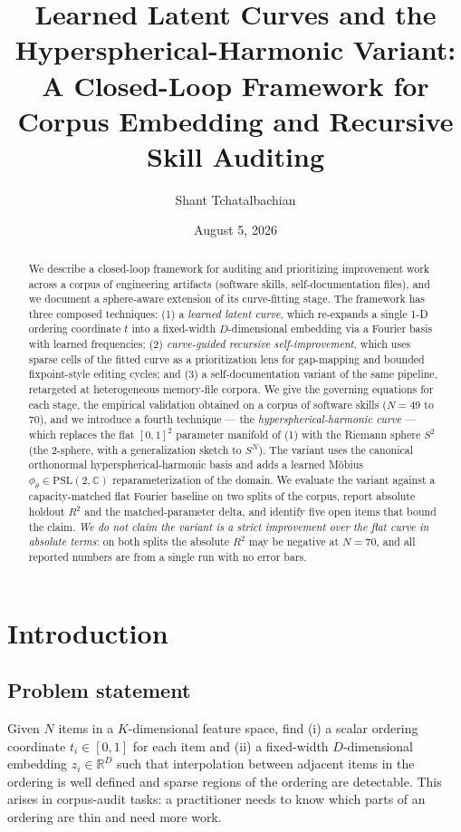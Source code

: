 \documentclass[11pt,a4paper]{article}
\title{Learned Latent Curves and the Hyperspherical-Harmonic Variant:\\
  {\large A Closed-Loop Framework for Corpus Embedding and Recursive Skill Auditing}}
\author{Shant Tchatalbachian}
\date{August 5, 2026}
\begin{document}
\maketitle

\begin{abstract}
We describe a closed-loop framework for auditing and prioritizing improvement work across a corpus of engineering artifacts (software skills, self-documentation files), and we document a sphere-aware extension of its curve-fitting stage. The framework has three composed techniques: (1) a \emph{learned latent curve}, which re-expands a single 1-D ordering coordinate $t$ into a fixed-width $D$-dimensional embedding via a Fourier basis with learned frequencies; (2) \emph{curve-guided recursive self-improvement}, which uses sparse cells of the fitted curve as a prioritization lens for gap-mapping and bounded fixpoint-style editing cycles; and (3) a self-documentation variant of the same pipeline, retargeted at heterogeneous memory-file corpora. We give the governing equations for each stage, the empirical validation obtained on a corpus of software skills ($N = 49$ to $70$), and we introduce a fourth technique --- the \emph{hyperspherical-harmonic curve} --- which replaces the flat $[0,1]^2$ parameter manifold of (1) with the Riemann sphere $S^2$ (the 2-sphere, with a generalization sketch to $S^N$). The variant uses the canonical orthonormal hyperspherical-harmonic basis and adds a learned M\"obius $\phi_\theta \in \mathrm{PSL}(2,\mathbb{C})$ reparameterization of the domain. We evaluate the variant against a capacity-matched flat Fourier baseline on two splits of the corpus, report absolute holdout $R^2$ and the matched-parameter delta, and identify five open items that bound the claim. \emph{We do not claim the variant is a strict improvement over the flat curve in absolute terms}: on both splits the absolute $R^2$ may be negative at $N=70$, and all reported numbers are from a single run with no error bars.
\end{abstract}

\section{Introduction}

\subsection{Problem statement}

Given $N$ items in a $K$-dimensional feature space, find (i) a scalar ordering coordinate $t_i \in [0,1]$ for each item and (ii) a fixed-width $D$-dimensional embedding $z_i \in \mathbb{R}^D$ such that interpolation between adjacent items in the ordering is well defined and sparse regions of the ordering are detectable. This arises in corpus-audit tasks: a practitioner needs to know which parts of an ordering are thin and need more work.
\end{document}
